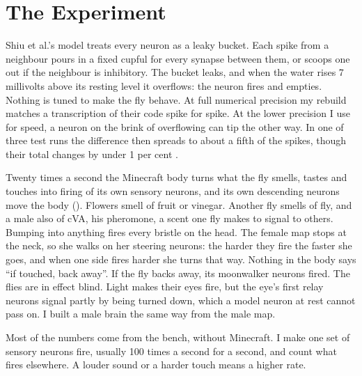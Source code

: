 \section{The Experiment}
\label{sec:experiment}

Shiu et al.'s model treats every neuron as a leaky bucket. Each spike from a neighbour pours in a fixed cupful for every synapse between them, or scoops one out if the neighbour is inhibitory. The bucket leaks, and when the water rises 7 millivolts above its resting level it overflows: the neuron fires and empties. Nothing is tuned to make the fly behave. At full numerical precision my rebuild matches a transcription of their code spike for spike. At the lower precision I use for speed, a neuron on the brink of overflowing can tip the other way. In one of three test runs the difference then spreads to about a fifth of the spikes, though their total changes by under 1 per cent .

Twenty times a second the Minecraft body turns what the fly smells, tastes and touches into firing of its own sensory neurons, and its own descending neurons move the body (). Flowers smell of fruit or vinegar. Another fly smells of fly, and a male also of cVA, his pheromone, a scent one fly makes to signal to others. Bumping into anything fires every bristle on the head. The female map stops at the neck, so she walks on her steering neurons: the harder they fire the faster she goes, and when one side fires harder she turns that way. Nothing in the body says ``if touched, back away''. If the fly backs away, its moonwalker neurons fired. The flies are in effect blind. Light makes their eyes fire, but the eye's first relay neurons signal partly by being turned down, which a model neuron at rest cannot pass on. I built a male brain the same way from the male map.

Most of the numbers come from the bench, without Minecraft. I make one set of sensory neurons fire, usually 100 times a second for a second, and count what fires elsewhere. A louder sound or a harder touch means a higher rate.

